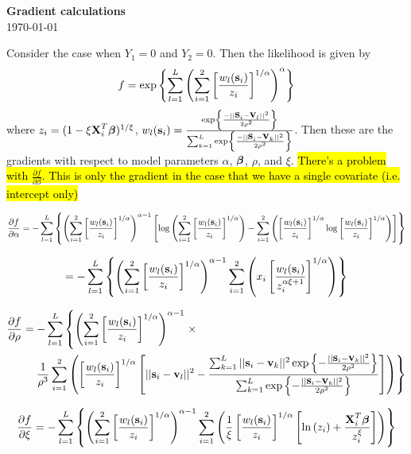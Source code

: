 \documentclass[11pt]{article}
\begin{document}
\linenumbers

\begin{center}
{\Large {\bf Gradient calculations}}\\
\today
\end{center}

Consider the case when $Y_1 = 0$ and $Y_2 = 0$. Then the likelihood is given by
\begin{align}
  f = \exp \left\{ \sum_{l = 1}^L \left( \sum_{i = 1}^2  \left[ \frac{ w_l(\mbox{\bf s}_i)}{z_i} \right]^{1 / \alpha} \right)^\alpha \right\}
\end{align}
where $z_i = (1 - \xi \mbox{\bf X}^T_i \mbox{\boldmath $\beta$})^{1 / \xi}$, $w_l(\mbox{\bf s}_i) = \frac{ \exp \left\{ \frac{- ||\mbox{\bf s}_i - \mbox{\bf v}_l||^2}{2 \rho^2} \right\} }{\sum_{k = 1}^L \exp \left\{ \frac{- ||\mbox{\bf s}_i - \mbox{\bf v}_k||^2}{2 \rho^2} \right\} }$.
Then these are the gradients with respect to model parameters $\alpha$, $\mbox{\boldmath $\beta$}$, $\rho$, and $\xi$. \hl{There's a problem with $\frac{\partial f}{ \partial \beta }$. This is only the gradient in the case that we have a single covariate (i.e. intercept only)}

\begin{align}
  \frac{\partial f}{\partial \alpha} = -\sum _{l=1}^{L} \left\{
    \left( \sum_{i = 1}^2  \left[ \frac{ w_l(\mbox{\bf s}_i)}{z_i} \right]^{1 / \alpha} \right)^{\alpha - 1}
    \left[
      \log \left( \sum_{i = 1}^2  \left[ \frac{ w_l(\mbox{\bf s}_i)}{z_i} \right]^{1 / \alpha} \right)
      -\sum_{i = 1}^2 \left(
        \left[ \frac{ w_l(\mbox{\bf s}_i)}{z_i} \right]^{1 / \alpha} \log  \left[ \frac{ w_l(\mbox{\bf s}_i)}{z_i} \right]^{1 / \alpha}
      \right)
    \right]
  \right\}
\end{align}

\begin{align}
   = -\sum _{l=1}^{L} \left\{
    \left( \sum_{i = 1}^2  \left[ \frac{ w_l(\mbox{\bf s}_i)}{z_i} \right]^{1 / \alpha} \right)^{\alpha - 1}
    \sum_{i = 1}^2 \left( x_{i}  \left[ \frac{ w_l(\mbox{\bf s}_i)}{z_i^{\alpha \xi + 1}} \right]^{1 / \alpha} \right)
  \right\}
\end{align}

\begin{align}
  \frac{ \partial f }{ \partial \rho } &= -\sum _{l=1}^{L} \left\{
    \left( \sum_{i = 1}^2 \left[ \frac{ w_l(\mbox{\bf s}_i) }{z_i} \right]^{1 / \alpha} \right)^{\alpha - 1} \right. \times \nonumber \\
    & \quad \left. \frac{ 1 }{\rho^3} \sum_{i = 1}^2
    \left( \left[ \frac{ w_l(\mbox{\bf s}_i)}{z_i} \right]^{1 / \alpha}
      \left[ ||\mbox{\bf s}_i - \mbox{\bf v}_l||^{2} -
        \frac{ \sum_{k=1}^{L} ||\mbox{\bf s}_i - \mbox{\bf v}_k||^{2} \exp \left \{ -\frac{ ||\mbox{\bf s}_i - \mbox{\bf v}_k||^{2} }{2\rho^{2}} \right\}}
             { \sum_{k=1}^{L} \exp \left\{ - \frac{ ||\mbox{\bf s}_i - \mbox{\bf v}_k||^{2} }{ 2 \rho^{2} } \right\} }
      \right]
    \right)
  \right\}
\end{align}

\begin{align}
  \frac{ \partial f }{ \partial \xi } = -\sum _{l=1}^{L} \left\{
    \left( \sum_{i = 1}^2 \left[ \frac{ w_l(\mbox{\bf s}_i) }{z_i} \right]^{1 / \alpha} \right)^{\alpha - 1}
    \sum_{i = 1}^2 \left(
      \frac{1}{\xi} \left[ \frac{ w_l(\mbox{\bf s}_i)}{z_i} \right]^{1 / \alpha} \left[ \ln  \left( z_i \right) + \frac{ \mbox{\bf X}^T_i \mbox{\boldmath $\beta$} }{ z_i^\xi } \right]
    \right)
  \right\}
\end{align}
\end{document}
